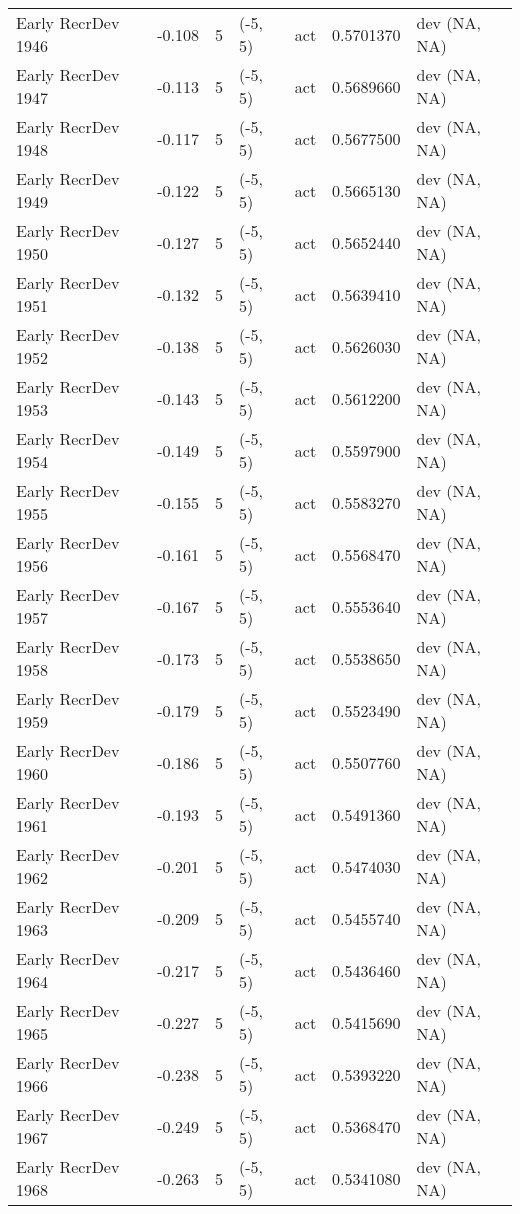 \documentclass[11pt,
  english,
  a4paper,
]{article}
\begin{document}
\begin{landscape}
\begin{longtable}[t]{>{\raggedright\arraybackslash}p{6cm}lllll>{\raggedright\arraybackslash}p{4cm}}
Early RecrDev 1946 & -0.108 & 5 & (-5, 5) & act & 0.5701370 & dev (NA, NA)\\
Early RecrDev 1947 & -0.113 & 5 & (-5, 5) & act & 0.5689660 & dev (NA, NA)\\
Early RecrDev 1948 & -0.117 & 5 & (-5, 5) & act & 0.5677500 & dev (NA, NA)\\
Early RecrDev 1949 & -0.122 & 5 & (-5, 5) & act & 0.5665130 & dev (NA, NA)\\
Early RecrDev 1950 & -0.127 & 5 & (-5, 5) & act & 0.5652440 & dev (NA, NA)\\
Early RecrDev 1951 & -0.132 & 5 & (-5, 5) & act & 0.5639410 & dev (NA, NA)\\
Early RecrDev 1952 & -0.138 & 5 & (-5, 5) & act & 0.5626030 & dev (NA, NA)\\
Early RecrDev 1953 & -0.143 & 5 & (-5, 5) & act & 0.5612200 & dev (NA, NA)\\
Early RecrDev 1954 & -0.149 & 5 & (-5, 5) & act & 0.5597900 & dev (NA, NA)\\
Early RecrDev 1955 & -0.155 & 5 & (-5, 5) & act & 0.5583270 & dev (NA, NA)\\
Early RecrDev 1956 & -0.161 & 5 & (-5, 5) & act & 0.5568470 & dev (NA, NA)\\
Early RecrDev 1957 & -0.167 & 5 & (-5, 5) & act & 0.5553640 & dev (NA, NA)\\
Early RecrDev 1958 & -0.173 & 5 & (-5, 5) & act & 0.5538650 & dev (NA, NA)\\
Early RecrDev 1959 & -0.179 & 5 & (-5, 5) & act & 0.5523490 & dev (NA, NA)\\
Early RecrDev 1960 & -0.186 & 5 & (-5, 5) & act & 0.5507760 & dev (NA, NA)\\
Early RecrDev 1961 & -0.193 & 5 & (-5, 5) & act & 0.5491360 & dev (NA, NA)\\
Early RecrDev 1962 & -0.201 & 5 & (-5, 5) & act & 0.5474030 & dev (NA, NA)\\
Early RecrDev 1963 & -0.209 & 5 & (-5, 5) & act & 0.5455740 & dev (NA, NA)\\
Early RecrDev 1964 & -0.217 & 5 & (-5, 5) & act & 0.5436460 & dev (NA, NA)\\
Early RecrDev 1965 & -0.227 & 5 & (-5, 5) & act & 0.5415690 & dev (NA, NA)\\
Early RecrDev 1966 & -0.238 & 5 & (-5, 5) & act & 0.5393220 & dev (NA, NA)\\
Early RecrDev 1967 & -0.249 & 5 & (-5, 5) & act & 0.5368470 & dev (NA, NA)\\
Early RecrDev 1968 & -0.263 & 5 & (-5, 5) & act & 0.5341080 & dev (NA, NA)\\

\end{longtable}
\end{landscape}
\end{document}
